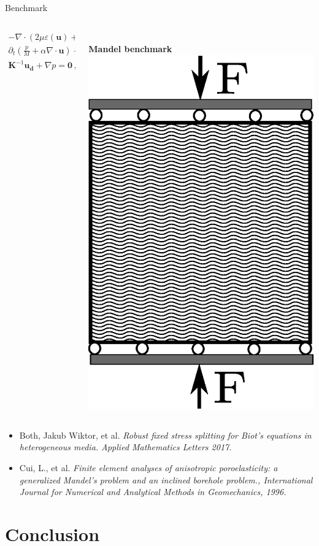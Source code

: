 \documentclass{beamer}
\begin{document}
\begin{frame}{Benchmark}
 \begin{columns}
  \begin{column}{0.45\textwidth}
    \begin{align*}
 	-\nabla \cdot \left(  2\mu\varepsilon (\mathbf{u}) + \nabla\cdot \mathbf{u}\right) + \alpha \nabla p=\mathbf{0} \, ,\\
 	\partial_t \left(\frac{p}{M} + \alpha \nabla \cdot \mathbf{u}\right)+ \nabla\cdot \mathbf{u_d}=S_f\,,\\ 
 	\mathbf{K}^{-1}\mathbf{u_d} + \nabla p = \mathbf{0}\,,\\
 \end{align*}
  \end{column}
    \begin{column}{0.45\textwidth} 
    \\ 
  {\bf Mandel benchmark}
    \centering
    \includegraphics[width=0.7\columnwidth]{figure/madleysvg}
    \end{column}
 \end{columns}

 \begin{itemize}
 \item 
 Both, Jakub Wiktor, et al. 
 \textit{Robust fixed stress splitting for Biot's equations in heterogeneous media.
 Applied Mathematics Letters 2017.}
  \item
Cui, L., et al.
  \textit{Finite element analyses of anisotropic 
  poroelasticity: a generalized Mandel's 
  problem and an inclined borehole problem.,
  International Journal for Numerical and Analytical Methods in Geomechanics,
  1996.} 
  \end{itemize}

\end{frame}



\section{Conclusion}
\end{document}
